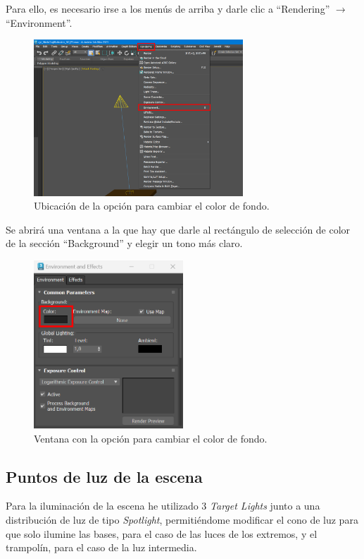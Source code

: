 \documentclass{article}
\begin{document}
\bigskip

Para ello, es necesario irse a los menús de arriba y darle clic a ``Rendering'' $\rightarrow$ ``Environment''.

\begin{figure}[H]
    \centering
    \includegraphics[width=0.7\textwidth]{imagenes/misc/bg-color1.png}
    \caption{Ubicación de la opción para cambiar el color de fondo.}
 \end{figure}

Se abrirá una ventana a la que hay que darle al rectángulo de selección de color de la sección ``Background'' y elegir un tono más claro.

\begin{figure}[H]
    \centering
    \includegraphics[width=0.5\textwidth]{imagenes/misc/bg-color2.png}
    \caption{Ventana con la opción para cambiar el color de fondo.}
 \end{figure}

\subsection{Puntos de luz de la escena}
Para la iluminación de la escena he utilizado 3 \textit{Target Lights} junto a una distribución de luz de tipo \textit{Spotlight}, permitiéndome modificar el cono de luz para que solo ilumine las bases, para el caso de las luces de los extremos, y el trampolín, para el caso de la luz intermedia.
\end{document}
